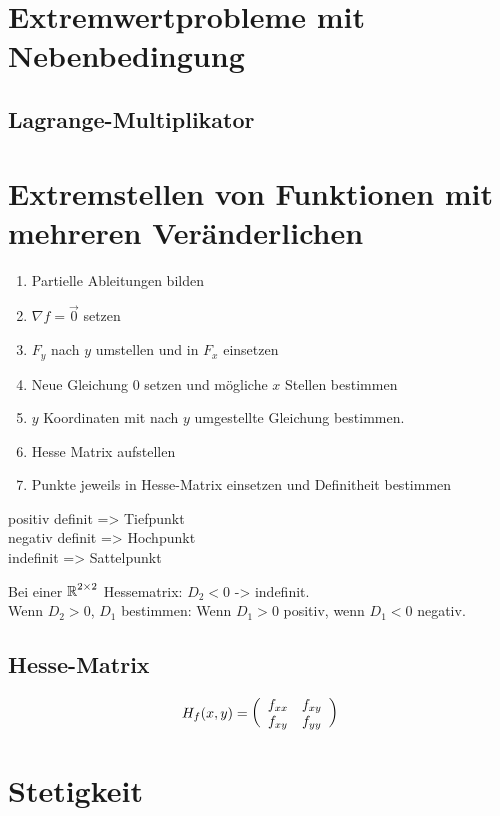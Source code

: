 \documentclass[main.tex]{subfiles}
\begin{document}
\renewcommand{\labelenumi}{\arabic{enumi}.}
\renewcommand*{\phi}{\varphi}

\section{Extremwertprobleme mit Nebenbedingung}
\subsection{Lagrange-Multiplikator}

\section{Extremstellen von Funktionen mit mehreren Veränderlichen}
\begin{enumerate}
    \item Partielle Ableitungen bilden
    \item $\nabla f = \vec{0}$ setzen
    \item $F_y$ nach $y$ umstellen und in $F_x$ einsetzen
    \item Neue Gleichung $0$ setzen und mögliche $x$ Stellen bestimmen
    \item $y$ Koordinaten mit nach $y$ umgestellte Gleichung bestimmen.
    \item Hesse Matrix aufstellen
    \item Punkte jeweils in Hesse-Matrix einsetzen und Definitheit bestimmen
\end{enumerate}

positiv definit => Tiefpunkt\\
negativ definit => Hochpunkt\\
indefinit => Sattelpunkt

Bei einer $\R^{2\times 2}$ Hessematrix: 
$D_2 < 0$ -> indefinit. \\
Wenn $D_2 > 0$, $D_1$ bestimmen: Wenn $D_1 > 0$ positiv, wenn $D_1 < 0$ negativ.

\subsection{Hesse-Matrix}
\[
    H_f(x, y) = \eqmatrix{cc}{
        f_{xx} & f_{xy} \\
        f_{xy} & f_{yy}
    }
\]

\section{Stetigkeit}
\end{document}
